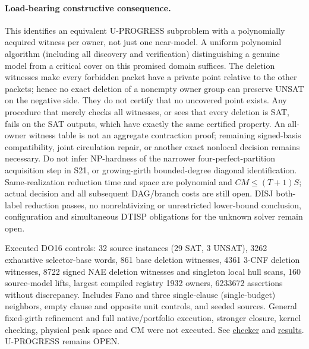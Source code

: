 \documentclass[11pt]{article}
\begin{document}
\paragraph{Load-bearing constructive consequence.}
This identifies an equivalent U-PROGRESS subproblem with a polynomially acquired witness per owner, not just one near-model. A uniform polynomial algorithm (including all discovery and verification) distinguishing a genuine model from a critical cover on this promised domain suffices. The deletion witnesses make every forbidden packet have a private point relative to the other packets; hence no exact deletion of a nonempty owner group can preserve UNSAT on the negative side. They do not certify that no uncovered point exists. Any procedure that merely checks all witnesses, or sees that every deletion is SAT, fails on the SAT outputs, which have exactly the same certified property. An all-owner witness table is not an aggregate contraction proof; remaining signed-basis compatibility, joint circulation repair, or another exact nonlocal decision remains necessary. Do not infer NP-hardness of the narrower four-perfect-partition acquisition step in S21, or growing-girth bounded-degree diagonal identification. Same-realization reduction time and space are polynomial and $CM\le(T+1)S$; actual decision and all subsequent DAG/branch costs are still open. DISJ both-label reduction passes, no nonrelativizing or unrestricted lower-bound conclusion, configuration and simultaneous DTISP obligations for the unknown solver remain open.

Executed DO16 controls: 32 source instances (29 SAT, 3 UNSAT), 3262 exhaustive selector-base words, 861 base deletion witnesses, 4361 3-CNF deletion witnesses, 8722 signed NAE deletion witnesses and singleton local hull scans, 160 source-model lifts, largest compiled registry 1932 owners, 6233672 assertions without discrepancy. Includes Fano and three single-clause (single-budget) neighbors, empty clause and opposite unit controls, and seeded sources. General fixed-girth refinement and full native/portfolio execution, stronger closure, kernel checking, physical peak space and CM were not executed. See \href{https://github.com/j15marti/pnp/commit/54ca0f65924690149d6f1846a544b8247442daa2}{checker} and \href{https://github.com/j15marti/pnp/commit/fd37c5883bf1264b94a59a1e6e4dede117b9dd43}{results}. U-PROGRESS remains OPEN.
\end{document}
